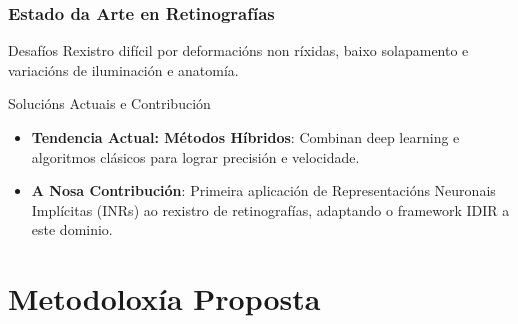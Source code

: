 \documentclass[xcolor=dvipsnames]{beamer}
\begin{document}
\begin{frame}
\frametitle{Estado da Arte en Retinografías}
\begin{block}{Desafíos}
    Rexistro difícil por deformacións non ríxidas, baixo solapamento e variacións de iluminación e anatomía.
\end{block}
\begin{alertblock}{Solucións Actuais e Contribución}
    \begin{itemize}
        \item \textbf{Tendencia Actual: Métodos Híbridos}: Combinan deep learning e algoritmos clásicos para lograr precisión e velocidade.
        \item \textbf{A Nosa Contribución}: Primeira aplicación de Representacións Neuronais Implícitas (INRs) ao rexistro de retinografías, adaptando o framework IDIR a este dominio.
    \end{itemize}
\end{alertblock}


\end{frame}

\section{Metodoloxía Proposta}
\end{document}
